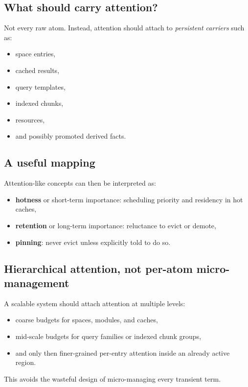 \documentclass[11pt]{article}
\begin{document}
\subsection{What should carry attention?}

Not every raw atom. Instead, attention should attach to \emph{persistent carriers} such as:
\begin{itemize}[leftmargin=2em]
  \item space entries,
  \item cached results,
  \item query templates,
  \item indexed chunks,
  \item resources,
  \item and possibly promoted derived facts.
\end{itemize}

\subsection{A useful mapping}

Attention-like concepts can then be interpreted as:
\begin{itemize}[leftmargin=2em]
  \item \textbf{hotness} or short-term importance: scheduling priority and residency in hot caches,
  \item \textbf{retention} or long-term importance: reluctance to evict or demote,
  \item \textbf{pinning}: never evict unless explicitly told to do so.
\end{itemize}

\subsection{Hierarchical attention, not per-atom micro-management}

A scalable system should attach attention at multiple levels:
\begin{itemize}[leftmargin=2em]
  \item coarse budgets for spaces, modules, and caches,
  \item mid-scale budgets for query families or indexed chunk groups,
  \item and only then finer-grained per-entry attention inside an already active region.
\end{itemize}

This avoids the wasteful design of micro-managing every transient term.
\end{document}
